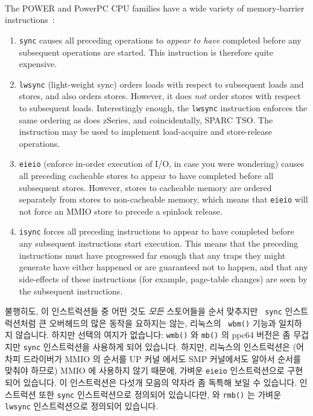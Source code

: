 The POWER and PowerPC\textsuperscript{\textregistered}
CPU families have a wide variety of memory-barrier
instructions~\cite{PowerPC94,MichaelLyons05a}:
\begin{enumerate}
\item	{\tt sync} causes all preceding operations to {\em appear to have}
	completed before any subsequent operations are started.
	This instruction is therefore quite expensive.
\item	{\tt lwsync} (light-weight sync) orders loads with respect to
	subsequent loads and stores, and also orders stores.
	However, it does {\em not} order stores with respect to subsequent
	loads.
	Interestingly enough, the {\tt lwsync} instruction enforces
	the same ordering as does zSeries, and coincidentally,
	SPARC TSO.
	The  instruction may be used to implement
	load-acquire and store-release operations.
\item	{\tt eieio} (enforce in-order execution of I/O, in case you
	were wondering) causes all preceding cacheable stores to appear
	to have completed before all subsequent stores.
	However, stores to cacheable memory are ordered separately from
	stores to non-cacheable memory, which means that {\tt eieio}
	will not force an MMIO store to precede a spinlock release.
\item	{\tt isync} forces all preceding instructions to appear to have
	completed before any subsequent instructions start execution.
	This means that the preceding instructions must have progressed
	far enough that any traps they might generate have either happened
	or are guaranteed not to happen, and that any side-effects of
	these instructions (for example, page-table changes) are seen by the
	subsequent instructions.
\end{enumerate}
\fi

불행히도, 이 인스트럭션들 중 어떤 것도 {\em 모든} 스토어들을 순서 맞추지만 {\tt
sync} 인스트럭션처럼 큰 오버헤드의 많은 동작을 요하지는 않는, 리눅스의 {\tt
wbm()} 기능과 일치하지 않습니다.
하지만 선택의 여지가 없습니다: {\tt wmb()} 와 {\tt mb()} 의 ppc64 버전은 좀
무겁지만 {\tt sync} 인스트럭션을 사용하게 되어 있습니다.
하지만, 리눅스의  인스트럭션은 (어차피 드라이버가 MMIO 의
순서를 UP 커널 에서도 SMP 커널에서도 알아서 순서를 맞춰야 하므로) MMIO 에
사용하지 않기 때문에, 가벼운 {\tt eieio} 인스트럭션으로 구현되어 있습니다.
이 인스트럭션은 다섯개 모음의 약자라 좀 독특해 보일 수 있습니다.
 인스트럭션 또한 {\tt sync} 인스트럭션으로 정의되어 있습니다만,
 와 {\tt rmb()} 는 가벼운 {\tt lwsync} 인스트럭션으로 정의되어
있습니다.
\iffalse


